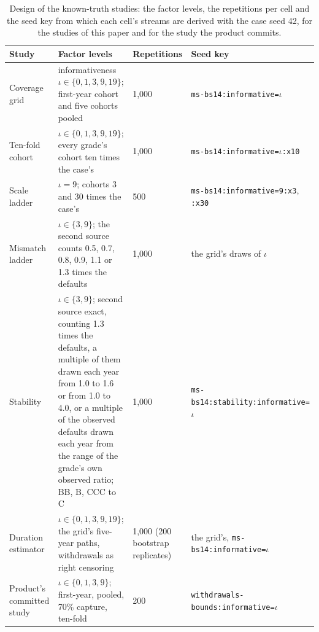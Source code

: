 \begin{table}[htbp]
\centering
\small
\caption{Design of the known-truth studies: the factor levels, the repetitions per cell and the seed key from which each cell's streams are derived with the case seed 42, for the studies of this paper and for the study the product commits.}
\label{tab:design}
\begin{tabular}{p{2.2cm}p{5.3cm}p{2.3cm}p{4.4cm}}
\toprule
Study & Factor levels & Repetitions & Seed key \\
\midrule
Coverage grid & \relax informativeness $\iota\in\{0,1,3,9,19\}$; first-year cohort and five cohorts pooled & 1,000 & \texttt{ms-bs14:\allowbreak informative=$\iota$} \\
Ten-fold cohort & $\iota\in\{0,1,3,9,19\}$; every grade's cohort ten times the case's & 1,000 & \texttt{ms-bs14:\allowbreak informative=$\iota$:x10} \\
Scale ladder & $\iota=9$; cohorts 3 and 30 times the case's & 500 & \texttt{ms-bs14:\allowbreak informative=9:x3}, \texttt{:x30} \\
Mismatch ladder & $\iota\in\{3,9\}$; the second source counts 0.5, 0.7, 0.8, 0.9, 1.1 or 1.3 times the defaults & 1,000 & \relax the grid's draws of $\iota$ \\
Stability & $\iota\in\{3,9\}$; second source exact, counting 1.3 times the defaults, a multiple of them drawn each year from 1.0 to 1.6 or from 1.0 to 4.0, or a multiple of the observed defaults drawn each year from the range of the grade's own observed ratio; BB, B, CCC to C & 1,000 & \texttt{ms-bs14:\allowbreak stability:\allowbreak informative=$\iota$} \\
Duration estimator & $\iota\in\{0,1,3,9,19\}$; the grid's five-year paths, withdrawals as right censoring & 1,000 (200 bootstrap replicates) & \relax the grid's, \texttt{ms-bs14:\allowbreak informative=$\iota$} \\
Product's committed study & $\iota\in\{0,1,3,9\}$; first-year, pooled, 70\% capture, ten-fold & 200 & \texttt{withdrawals-bounds:\allowbreak informative=$\iota$} \\
\bottomrule
\end{tabular}
\end{table}
